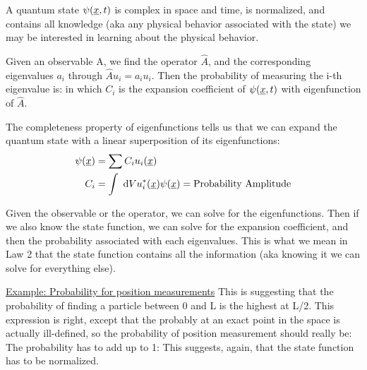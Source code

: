 \documentclass{school-22.101-notes}
\date{September 14, 2011}
\begin{document}
\maketitle

A quantum state $\psi(\underline{x}, t)$ is complex in space and time, is normalized, and contains all knowledge (aka any physical behavior associated with the state) we may be interested in learning about the physical behavior. 

Given an observable A, we find the operator $\hat{A}$, and the corresponding eigenvalues $a_i$ through $\hat{A} u_i = a_i u_i$. Then the probability of measuring the i-th eigenvalue is:
in which $C_i$ is the expansion coefficient of $\psi(\underline{x}, t)$ with eigenfunction of $\hat{A}$. 

The completeness property of eigenfunctions tells us that we can expand the quantum state with a linear superposition of its eigenfunctions:
\begin{align}
\psi(\underline{x}) &= \displaystyle\sum C_i u_i (\underline{x}) \\
C_i &= \int \mbox{ }\mathrm{d} V u_i^* (\underline{x}) \psi(\underline{x}) = \mbox{Probability Amplitude}
\end{align}

Given the observable or the operator, we can solve for the eigenfunctions. Then if we also know the state function, we can solve for the expansion coefficient, and then the probability associated with each eigenvalues. This is what we mean in Law 2 that the state function contains all the information (aka knowing it we can solve for everything else). 

\uline{Example: Probability for position measurements} 
This is suggesting that the probability of finding a particle between 0 and L is the highest at L/2. This expression is right, except that the probably at an exact point in the space is actually ill-defined, so the probability of position measurement should really be:
The probability has to add up to 1: 
This suggests, again, that the state function has to be normalized. 
\end{document}
